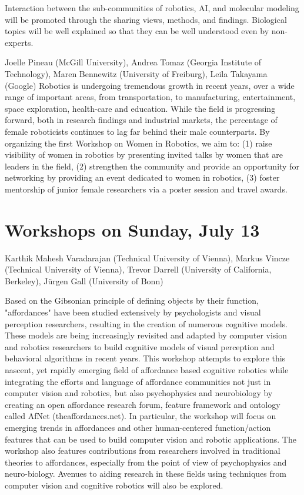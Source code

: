 \begin{spacing}{1.0}
{Interaction between the sub-communities of robotics, AI, and molecular modeling will be promoted through the sharing views, methods, and findings. Biological topics will be well explained so that they can be well understood even by non-experts.
}


\clearpage
{}
{Joelle Pineau (McGill University), Andrea Tomaz (Georgia Institute of Technology), Maren Bennewitz (University of Freiburg), Leila Takayama (Google)}
{
Robotics is undergoing tremendous growth in recent years, over a wide range of important areas, from transportation, to manufacturing, entertainment, space exploration, health-care and education. While the field is progressing forward, both in research findings and industrial markets, the percentage of female roboticists continues to lag far behind their male counterparts. By organizing the first Workshop on Women in Robotics, we aim to: (1) raise visibility of women in robotics by presenting invited talks by women that are leaders in the field, (2) strengthen the community and provide an opportunity for networking by providing an event dedicated to women in robotics, (3) foster mentorship of junior female researchers via a poster session and travel awards.
}


\chapter{Workshops on Sunday, July 13}
\vspace*{-1.0cm}

{Karthik Mahesh Varadarajan (Technical University of Vienna), Markus Vincze (Technical University of Vienna), Trevor Darrell (University of California, Berkeley), Jürgen Gall (University of Bonn)}
{
Based on the Gibsonian principle of defining objects by their function, "affordances" have been studied extensively by psychologists and visual perception researchers, resulting in the creation of numerous cognitive models. These models are being increasingly revisited and adapted by computer vision and robotics researchers to build cognitive models of visual perception and behavioral algorithms in recent years. This workshop attempts to explore this nascent, yet rapidly emerging field of affordance based cognitive robotics while integrating the efforts and language of affordance communities not just in computer vision and robotics, but also psychophysics and neurobiology by creating an open affordance research forum, feature framework and ontology called AfNet (theaffordances.net). In particular, the workshop will focus on emerging trends in affordances and other human-centered function/action features that can be used to build computer vision and robotic applications. The workshop also features contributions from researchers involved in traditional theories to affordances, especially from the point of view of psychophysics and neuro-biology. Avenues to aiding research in these fields using techniques from computer vision and cognitive robotics will also be explored.

}
\end{spacing}
